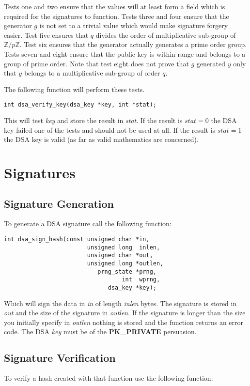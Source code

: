 \documentclass[synpaper]{book}
\def\Z{{\mathbb Z}}
\newcommand{\mysection}[1]    %
	{                   %
	\section{#1}
   \markboth{\textsf{www.libtom.org}}{\thesection ~ {#1}}
	}
\begin{document}
Tests one and two ensure that the values will at least form a field which is required for the signatures to  
function.  Tests three and four ensure that the generator $g$ is not set to a trivial value which would make signature
forgery easier.  Test five ensures that $q$ divides the order of multiplicative sub-group of $\Z/p\Z$. Test six
ensures that the generator actually generates a prime order group.  Tests seven and eight ensure that the public key
is within range and belongs to a group of prime order.  Note that test eight does not prove that $g$ generated $y$ only
that $y$ belongs to a multiplicative sub-group of order $q$. 

The following function will perform these tests.

\begin{verbatim}
int dsa_verify_key(dsa_key *key, int *stat);
\end{verbatim}

This will test \textit{key} and store the result in \textit{stat}.  If the result is $stat = 0$ the DSA key failed one of the tests
and should not be used at all.  If the result is $stat = 1$ the DSA key is valid (as far as valid mathematics are concerned).

\mysection{Signatures}
\subsection{Signature Generation}
To generate a DSA signature call the following function:

\begin{verbatim}
int dsa_sign_hash(const unsigned char *in,  
                        unsigned long  inlen,
                        unsigned char *out, 
                        unsigned long *outlen,
                           prng_state *prng, 
                                  int  wprng, 
                              dsa_key *key);
\end{verbatim}

Which will sign the data in \textit{in} of length \textit{inlen} bytes.  The signature is stored in \textit{out} and the size
of the signature in \textit{outlen}.  If the signature is longer than the size you initially specify in \textit{outlen} nothing
is stored and the function returns an error code.  The DSA \textit{key} must be of the \textbf{PK\_PRIVATE} persuasion.

\subsection{Signature Verification}
To verify a hash created with that function use the following function:
\end{document}

